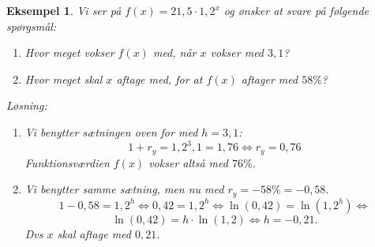 \documentclass[12pt,oneside,a4paper]{article}
\newtheorem{eks}[thm]{Eksempel}
\begin{document}
\begin{eks}
    Vi ser på $f(x) = 21,5 \cdot 1,2^x$ og ønsker at svare på følgende spørgsmål:
    \begin{enumerate}
        \item Hvor meget vokser $f(x)$ med, når $x$ vokser med $3,1$?
        \item Hvor meget skal $x$ aftage med, for at $f(x)$ aftager med $58\%$?
    \end{enumerate}

    Løsning:
    \begin{enumerate}
        \item Vi benytter sætningen oven for med $h=3,1$:
            $$
            1+r_y = 1,2^3,1 = 1,76 \Leftrightarrow r_y = 0,76
            $$
            Funktionsværdien $f(x)$ vokser altså med $76\%$.
        \item Vi benytter samme sætning, men nu med $r_y = -58\% = -0,58$.
            $$
            1-0,58 = 1,2^h \Leftrightarrow 0,42 = 1,2^h \Leftrightarrow \ln(0,42) = \ln(1,2^h) \Leftrightarrow
            $$
            $$
            \ln(0,42) = h\cdot \ln(1,2) \Leftrightarrow h = -0,21.
            $$
            Dvs $x$ skal aftage med $0,21$.
    \end{enumerate}
\end{eks}
\end{document}

